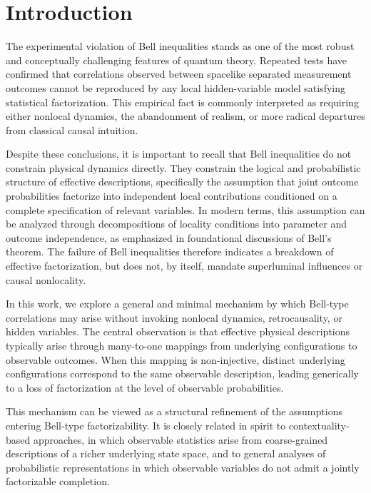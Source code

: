 \section{Introduction}
  \label{sec:introduction}

  The experimental violation of Bell inequalities stands as one of the most robust
  and conceptually challenging features of quantum theory.
  Repeated tests have confirmed that correlations observed between spacelike separated
  measurement outcomes cannot be reproduced by any local hidden-variable model
  satisfying statistical factorization.
  This empirical fact is commonly interpreted as requiring either nonlocal dynamics,
  the abandonment of realism, or more radical departures from classical causal intuition.

  Despite these conclusions, it is important to recall that Bell inequalities do not
  constrain physical dynamics directly.
  They constrain the logical and probabilistic structure of effective descriptions,
  specifically the assumption that joint outcome probabilities factorize into independent
  local contributions conditioned on a complete specification of relevant variables.
  In modern terms, this assumption can be analyzed through decompositions of locality
  conditions into parameter and outcome independence, as emphasized in foundational
  discussions of Bell’s theorem.
  The failure of Bell inequalities therefore indicates a breakdown of effective
  factorization, but does not, by itself, mandate superluminal influences or causal
  nonlocality.

  In this work, we explore a general and minimal mechanism by which Bell-type
  correlations may arise without invoking nonlocal dynamics, retrocausality, or hidden
  variables.
  The central observation is that effective physical descriptions typically arise through
  many-to-one mappings from underlying configurations to observable outcomes.
  When this mapping is non-injective, distinct underlying configurations correspond
  to the same observable description, leading generically to a loss of factorization at
  the level of observable probabilities.

  This mechanism can be viewed as a structural refinement of the assumptions entering
  Bell-type factorizability.
  It is closely related in spirit to contextuality-based approaches, in which observable
  statistics arise from coarse-grained descriptions of a richer underlying state space,
  and to general analyses of probabilistic representations in which observable variables
  do not admit a jointly factorizable completion.

